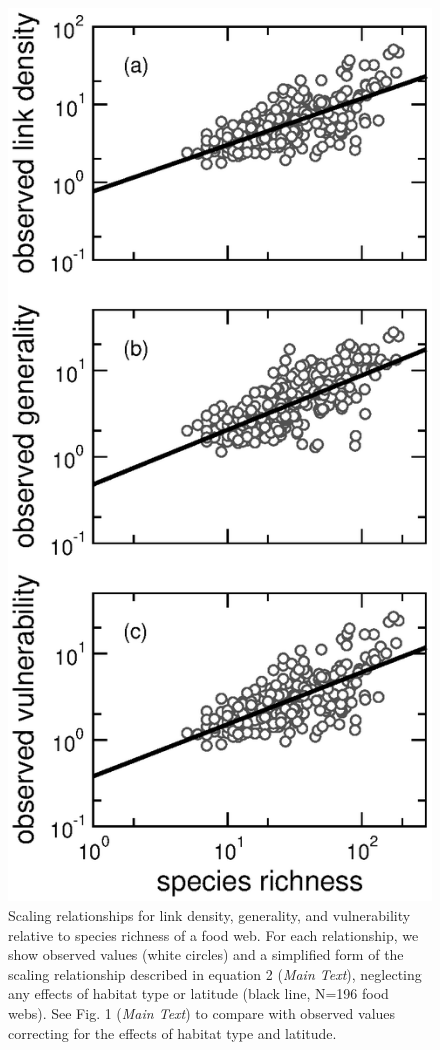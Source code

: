 \documentclass[12pt]{article}
\begin{document}
  \begin{figure}[!h]
  \centerline{\includegraphics*[height=.75\textheight]{Figures/by_TL/scaling_with_S/proportions/S_fitlines_nonts_corrected_observed_corrected.eps}}
  \caption{Scaling relationships for link density, generality, 
  and vulnerability relative to species richness of a food web. 
  For each relationship, we show observed values (white circles) and 
  a simplified form of the scaling relationship described in equation 2 (\emph{Main Text}), neglecting 
  any effects of habitat type or latitude (black line, N=196 food webs). See Fig. 1 (\emph{Main Text}) to compare with 
  observed values correcting for the effects of habitat type and latitude. }
  \label{props_v_lat_obs}
  \end{figure}



\newpage


\end{document}
